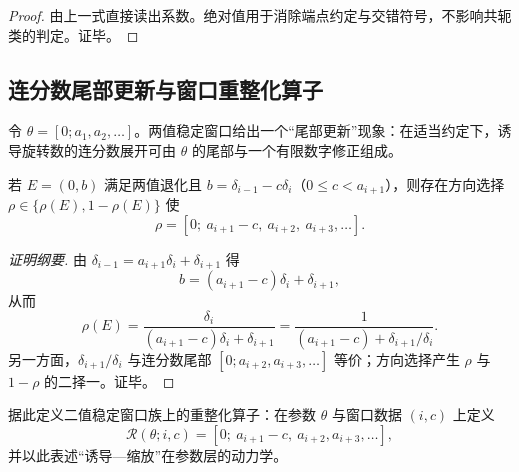 \begin{proof}
由上一式直接读出系数。绝对值用于消除端点约定与交错符号，不影响共轭类的判定。证毕。
\end{proof}

\subsection{连分数尾部更新与窗口重整化算子}

令 $\theta=[0;a_1,a_2,\dots]$。两值稳定窗口给出一个“尾部更新”现象：在适当约定下，诱导旋转数的连分数展开可由 $\theta$ 的尾部与一个有限数字修正组成。

\begin{theorem}[尾部读出公式]\label{thm:tail}
若 $E=(0,b)$ 满足两值退化且 $b=\delta_{i-1}-c\delta_i$（$0\le c<a_{i+1}$），则存在方向选择 $\rho\in\{\rho(E),1-\rho(E)\}$ 使
\[
\rho=[0;\ a_{i+1}-c,\ a_{i+2},\ a_{i+3},\dots].
\]
\end{theorem}

\begin{proof}[证明纲要]
由 $\delta_{i-1}=a_{i+1}\delta_i+\delta_{i+1}$ 得
\[
b=(a_{i+1}-c)\delta_i+\delta_{i+1},
\]
从而
\[
\rho(E)=\frac{\delta_i}{(a_{i+1}-c)\delta_i+\delta_{i+1}}
=\frac{1}{(a_{i+1}-c)+\delta_{i+1}/\delta_i}.
\]
另一方面，$\delta_{i+1}/\delta_i$ 与连分数尾部 $[0;a_{i+2},a_{i+3},\dots]$ 等价；方向选择产生 $\rho$ 与 $1-\rho$ 的二择一。证毕。
\end{proof}

据此定义二值稳定窗口族上的重整化算子：在参数 $\theta$ 与窗口数据 $(i,c)$ 上定义
\[
\mathcal{R}(\theta;i,c)=[0;\ a_{i+1}-c,\ a_{i+2},a_{i+3},\dots],
\]
并以此表述“诱导—缩放”在参数层的动力学。

